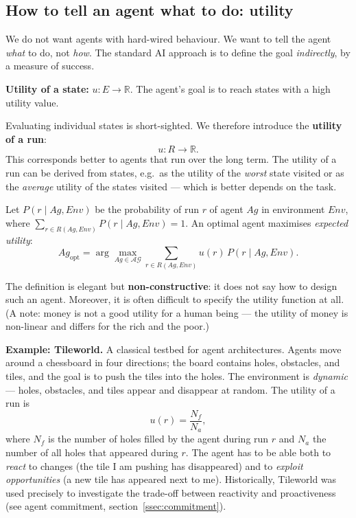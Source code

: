 \documentclass[11pt,a4paper]{article}
\theoremstyle{definition}
\begin{document}
\subsection{How to tell an agent what to do: utility}

We do not want agents with hard-wired behaviour. We want to tell the agent \emph{what} to do, not
\emph{how}. The standard AI approach is to define the goal \emph{indirectly}, by a measure of
success.

\begin{defbox}[Utility]
\textbf{Utility of a state:} $u : E \to \mathbb{R}$. The agent's goal is to reach states with a
high utility value.

Evaluating individual states is short-sighted. We therefore introduce the \textbf{utility of a
run}:
\[
u : R \to \mathbb{R} .
\]
This corresponds better to agents that run over the long term. The utility of a run can be derived
from states, e.g.\ as the utility of the \emph{worst} state visited or as the \emph{average}
utility of the states visited --- which is better depends on the task.
\end{defbox}

\begin{defbox}
Let $P(r \mid Ag, \mathit{Env})$ be the probability of run $r$ of agent $Ag$ in environment
$\mathit{Env}$, where $\sum_{r \in R(Ag,\mathit{Env})} P(r \mid Ag,\mathit{Env}) = 1$. An optimal
agent maximises \emph{expected utility}:
\[
Ag_{\mathrm{opt}} = \arg\max_{Ag \in \mathcal{AG}} \sum_{r \in R(Ag,\mathit{Env})}
u(r)\, P(r \mid Ag, \mathit{Env}).
\]
\end{defbox}

The definition is elegant but \textbf{non-constructive}: it does not say how to design such an
agent. Moreover, it is often difficult to specify the utility function at all. (A note: money is
not a good utility for a human being --- the utility of money is non-linear and differs for the
rich and the poor.)

\medskip
\noindent\textbf{Example: Tileworld.} A classical testbed for agent architectures. Agents move
around a chessboard in four directions; the board contains holes, obstacles, and tiles, and the
goal is to push the tiles into the holes. The environment is \emph{dynamic} --- holes, obstacles,
and tiles appear and disappear at random. The utility of a run is
\[
u(r) = \frac{N_f}{N_a},
\]
where $N_f$ is the number of holes filled by the agent during run $r$ and $N_a$ the number of all
holes that appeared during $r$. The agent has to be able both to \emph{react} to changes (the tile
I am pushing has disappeared) and to \emph{exploit opportunities} (a new tile has appeared next to
me). Historically, Tileworld was used precisely to investigate the trade-off between reactivity and
proactiveness (see agent commitment, section~\ref{ssec:commitment}).
\end{document}
